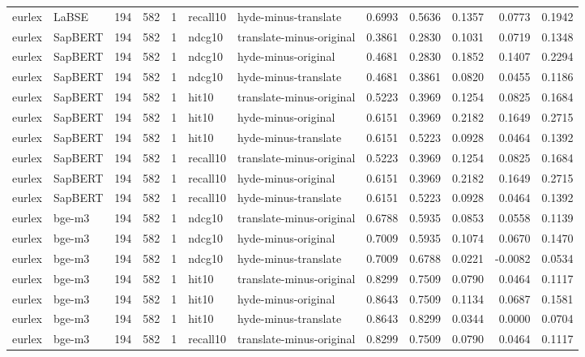 \begin{tabular}{llrrrllrrrrr}
eurlex & LaBSE & 194 & 582 & 1 & recall10 & hyde-minus-translate & 0.6993 & 0.5636 & 0.1357 & 0.0773 & 0.1942 \\
eurlex & SapBERT & 194 & 582 & 1 & ndcg10 & translate-minus-original & 0.3861 & 0.2830 & 0.1031 & 0.0719 & 0.1348 \\
eurlex & SapBERT & 194 & 582 & 1 & ndcg10 & hyde-minus-original & 0.4681 & 0.2830 & 0.1852 & 0.1407 & 0.2294 \\
eurlex & SapBERT & 194 & 582 & 1 & ndcg10 & hyde-minus-translate & 0.4681 & 0.3861 & 0.0820 & 0.0455 & 0.1186 \\
eurlex & SapBERT & 194 & 582 & 1 & hit10 & translate-minus-original & 0.5223 & 0.3969 & 0.1254 & 0.0825 & 0.1684 \\
eurlex & SapBERT & 194 & 582 & 1 & hit10 & hyde-minus-original & 0.6151 & 0.3969 & 0.2182 & 0.1649 & 0.2715 \\
eurlex & SapBERT & 194 & 582 & 1 & hit10 & hyde-minus-translate & 0.6151 & 0.5223 & 0.0928 & 0.0464 & 0.1392 \\
eurlex & SapBERT & 194 & 582 & 1 & recall10 & translate-minus-original & 0.5223 & 0.3969 & 0.1254 & 0.0825 & 0.1684 \\
eurlex & SapBERT & 194 & 582 & 1 & recall10 & hyde-minus-original & 0.6151 & 0.3969 & 0.2182 & 0.1649 & 0.2715 \\
eurlex & SapBERT & 194 & 582 & 1 & recall10 & hyde-minus-translate & 0.6151 & 0.5223 & 0.0928 & 0.0464 & 0.1392 \\
eurlex & bge-m3 & 194 & 582 & 1 & ndcg10 & translate-minus-original & 0.6788 & 0.5935 & 0.0853 & 0.0558 & 0.1139 \\
eurlex & bge-m3 & 194 & 582 & 1 & ndcg10 & hyde-minus-original & 0.7009 & 0.5935 & 0.1074 & 0.0670 & 0.1470 \\
eurlex & bge-m3 & 194 & 582 & 1 & ndcg10 & hyde-minus-translate & 0.7009 & 0.6788 & 0.0221 & -0.0082 & 0.0534 \\
eurlex & bge-m3 & 194 & 582 & 1 & hit10 & translate-minus-original & 0.8299 & 0.7509 & 0.0790 & 0.0464 & 0.1117 \\
eurlex & bge-m3 & 194 & 582 & 1 & hit10 & hyde-minus-original & 0.8643 & 0.7509 & 0.1134 & 0.0687 & 0.1581 \\
eurlex & bge-m3 & 194 & 582 & 1 & hit10 & hyde-minus-translate & 0.8643 & 0.8299 & 0.0344 & 0.0000 & 0.0704 \\
eurlex & bge-m3 & 194 & 582 & 1 & recall10 & translate-minus-original & 0.8299 & 0.7509 & 0.0790 & 0.0464 & 0.1117 \\

\end{tabular}

